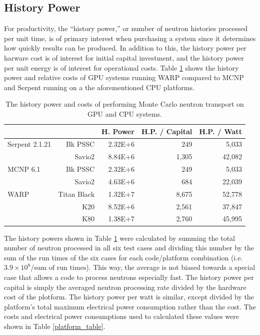 \documentclass[preprint,12pt]{elsarticle}
\begin{document}
\newpage
\subsection{History Power}

For productivity, the ``history power,'' or  number of neutron histories processed per unit time, is of primary interest when purchasing a system since it determines how quickly results can be produced.  In addition to this, the history power per harware cost is of interest for initial capital investment, and the history power per unit energy is of interest for operational costs.  Table \ref{history_power} shows the history power and relative costs of GPU systems running WARP compared to MCNP and Serpent running on a the aforementioned CPU platforms.  

\begin{table}[h]
\centering
\caption{The history power and costs of performing Monte Carlo neutron transport on GPU and CPU systems.}
\label{history_power}
\small
\begin{tabular}{| l r | r | r | r |}
\cline{3-5}
\multicolumn{2}{c|}{}             & H. Power   & H.P. / Capital   & H.P. / Watt  \\
\hline                            
Serpent 2.1.21   &   Bk PSSC      & 2.32E+6    &   249           &  5,033        \\
                 &   Savio2       & 8.84E+6    & 1,305           & 42,082        \\
\hline                                 
MCNP 6.1         &   Bk PSSC      & 2.32E+6    &   249           &  5,033        \\
                 &   Savio2       & 4.63E+6    &   684           & 22,039        \\
\hline                            
WARP             &   Titan Black  & 1.32E+7    & 8,675           & 52,778        \\
                 &   K20          & 8.52E+6    & 2,561           & 37,847        \\
                 &   K80          & 1.38E+7    & 2,760           & 45,995        \\
\hline
\end{tabular}
\end{table}

The history powers shown in Table \ref{history_power} were calculated by summing the total number of neutron processed in all six test cases and dividing this number by the sum of the run times of the six cases for each code/platform combination (i.e. $3.9\times10^8 / \textrm{sum of run times}$).  This way, the average is not biased towards a special case that allows a code to process neutrons especially fast.  The history power per capital is simply the averaged neutron processing rate divided by the hardware cost of the plotform.  The history power per watt is similar, except divided by the platform's total maximum electrical power consumption rather than the cost.  The costs and electrical power consumptions used to calculated these values were shown in Table \ref{platform_table}.
\end{document}
